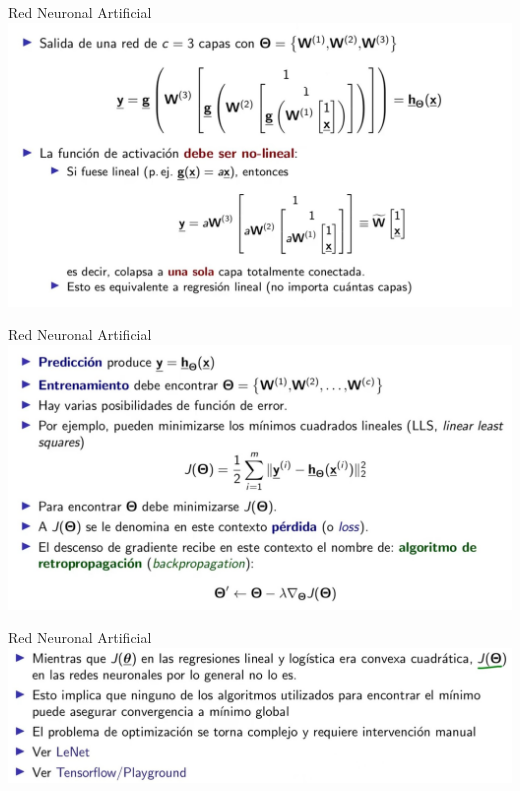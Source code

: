 \documentclass[8pt]{beamer}  %
\begin{document}
\begin{frame}{Red Neuronal Artificial}
\includegraphics[width=\textwidth]{im13}
\end{frame}
\begin{frame}{Red Neuronal Artificial}
\includegraphics[width=\textwidth]{im14}
\end{frame}
\begin{frame}{Red Neuronal Artificial}
\includegraphics[width=\textwidth]{im15}
\end{frame}
\end{document}
